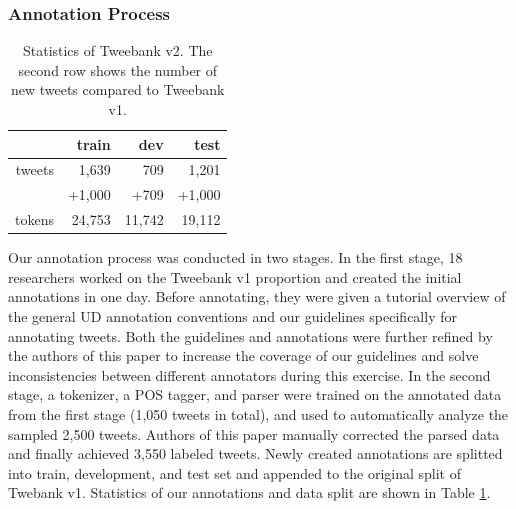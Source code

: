 \documentclass[11pt,a4paper]{article}
\begin{document}
\subsubsection{Annotation Process}
\begin{table}
	\centering
	\begin{tabular}{rrrr}
		\hline
		& train & dev & test \\
		\hline
		tweets 		&	1,639 		&	709		&	1,201\\
		& +1,000 & +709 & +1,000\\
		tokens 		&	24,753		&	11,742	&	19,112\\
		\hline
	\end{tabular}
\caption{Statistics of {\sc Tweebank v2}.
The second row shows the number of new tweets compared to
{\sc Tweebank v1}.\label{tbl:data-stat}
}
\end{table}
Our annotation process was conducted in two stages.
In the first stage, 18 researchers worked on the {\sc Tweebank v1}
proportion and created the initial annotations in one day.
Before annotating, they were given a tutorial overview of the general UD
annotation conventions and our guidelines specifically for annotating tweets.
Both the guidelines and annotations
were further refined by the authors of this paper to increase
the coverage of our guidelines and solve inconsistencies between
different annotators during this exercise. In the second stage, a tokenizer, a POS tagger, and
parser were trained on the annotated data from the first stage (1,050 tweets in total),
and used to automatically analyze the sampled 2,500 tweets.  Authors 
of this paper manually corrected the parsed data and finally achieved 3,550 labeled tweets.
Newly created annotations are splitted into train, development, and test set and appended
to the original split of {\sc Twebank v1}. Statistics of our annotations and data split are shown
in Table \ref{tbl:data-stat}.
\end{document}
